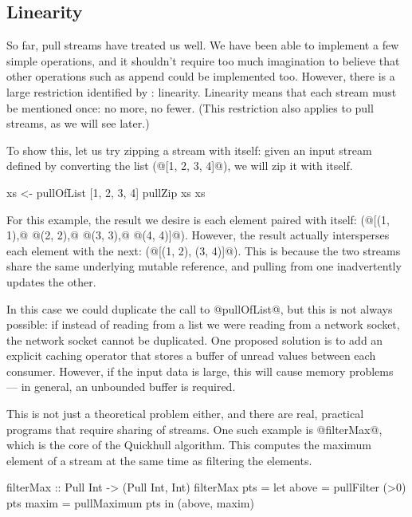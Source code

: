 \subsection{Linearity}
So far, pull streams have treated us well. We have been able to implement a few simple operations, and it shouldn't require too much imagination to believe that other operations such as append could be implemented too.
However, there is a large restriction identified by \citet{bernardy2015duality}: linearity.
Linearity means that each stream must be mentioned once: no more, no fewer.
(This restriction also applies to pull streams, as we will see later.)

To show this, let us try zipping a stream with itself: given an input stream defined by converting the list (@[1, 2, 3, 4]@), we will zip it with itself.

\begin{code}
xs <- pullOfList [1, 2, 3, 4]
pullZip xs xs
\end{code}

For this example, the result we desire is each element paired with itself: (@[(1, 1),@ @(2, 2),@ @(3, 3),@ @(4, 4)]@).
However, the result actually intersperses each element with the next: (@[(1, 2), (3, 4)]@).
This is because the two streams share the same underlying mutable reference, and pulling from one inadvertently updates the other.

In this case we could duplicate the call to @pullOfList@, but this is not always possible: if instead of reading from a list we were reading from a network socket, the network socket cannot be duplicated.
One proposed solution is to add an explicit caching operator that stores a buffer of unread values between each consumer. However, if the input data is large, this will cause memory problems --- in general, an unbounded buffer is required. 

This is not just a theoretical problem either, and there are real, practical programs that require sharing of streams.
One such example is @filterMax@, which is the core of the Quickhull algorithm.
This computes the maximum element of a stream at the same time as filtering the elements.

\begin{code}
filterMax :: Pull Int -> (Pull Int, Int)
filterMax pts
 = let above = pullFilter (>0) pts
       maxim = pullMaximum     pts
   in (above, maxim)
\end{code}

